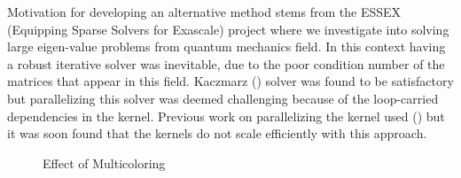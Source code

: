Motivation for developing an alternative method stems from the ESSEX (Equipping Sparse Solvers for Exascale) project \cite{ESSEX}
 where we investigate into solving large eigen-value problems from quantum mechanics field. In this context having a robust iterative solver was inevitable, due to the poor condition number of the matrices that appear in this field. Kaczmarz (\KACZ) solver was found to be satisfactory but parallelizing this solver was deemed challenging because of the loop-carried dependencies in the kernel. Previous work on parallelizing the \KACZ kernel used \MCfull (\MC) \cite{feast_mc} but it was soon found that the kernels do not scale efficiently with this approach.

  \begin{figure}[thbp]
  	\centering
  	\hspace{1em}
  	
  	\caption{Effect of Multicoloring}
  	\label{fig:motivation}
  \end{figure}
  
